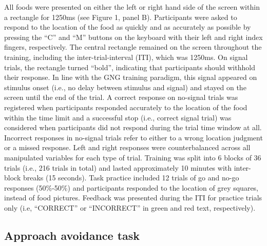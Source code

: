 \documentclass[man,floatsintext]{apa6}
\begin{document}
All foods were presented on either the left or right hand side of the
screen within a rectangle for 1250ms (see Figure 1, panel B).
Participants were asked to respond to the location of the food as
quickly and as accurately as possible by pressing the \enquote{C} and
\enquote{M} buttons on the keyboard with their left and right index
fingers, respectively. The central rectangle remained on the screen
throughout the training, including the inter-trial-interval (ITI), which
was 1250ms. On signal trials, the rectangle turned \enquote{bold},
indicating that participants should withhold their response. In line
with the GNG training paradigm, this signal appeared on stimulus onset
(i.e., no delay between stimulus and signal) and stayed on the screen
until the end of the trial. A correct response on no-signal trials was
registered when participants responded accurately to the location of the
food within the time limit and a successful stop (i.e., correct signal
trial) was considered when participants did not respond during the trial
time window at all. Incorrect responses in no-signal trials refer to
either to a wrong location judgment or a missed response. Left and right
responses were counterbalanced across all manipulated variables for each
type of trial. Training was split into 6 blocks of 36 trials (i.e., 216
trials in total) and lasted approximately 10 minutes with inter-block
breaks (15 seconds). Task practice included 12 trials of go and no-go
responses (50\%-50\%) and participants responded to the location of grey
squares, instead of food pictures. Feedback was presented during the ITI
for practice trials only (i.e, \enquote{CORRECT} or \enquote{INCORRECT}
in green and red text, respectively).

\subsection{Approach avoidance task}\label{aat}

\par
\end{document}
